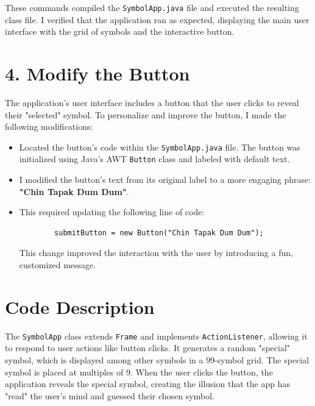 \documentclass[12pt, a4paper]{article}
\begin{document}
These commands compiled the \texttt{SymbolApp.java} file and executed the resulting class file. I verified that the application ran as expected, displaying the main user interface with the grid of symbols and the interactive button.

\section*{4. Modify the Button}
\hspace{1.5cm}
The application’s user interface includes a button that the user clicks to reveal their "selected" symbol. To personalize and improve the button, I made the following modifications:
\begin{itemize}
    \item Located the button's code within the \texttt{SymbolApp.java} file. The button was initialized using Java’s AWT \texttt{Button} class and labeled with default text.
    \item I modified the button’s text from its original label to a more engaging phrase: \textbf{"Chin Tapak Dum Dum"}.
    \item This required updating the following line of code:
    \begin{verbatim}
        submitButton = new Button("Chin Tapak Dum Dum");
    \end{verbatim}
    This change improved the interaction with the user by introducing a fun, customized message.
\end{itemize}

\section*{Code Description}
\hspace{1.5cm}
The \texttt{SymbolApp} class extends \texttt{Frame} and implements \texttt{ActionListener}, allowing it to respond to user actions like button clicks. It generates a random "special" symbol, which is displayed among other symbols in a 99-symbol grid. The special symbol is placed at multiples of 9. When the user clicks the button, the application reveals the special symbol, creating the illusion that the app has "read" the user's mind and guessed their chosen symbol.
\end{document}
